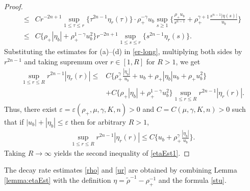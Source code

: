 \documentclass[a4paper,12pt,draft]{article}
\theoremstyle{remark}
\def\d{\partial}
\def\rt{\tilde{\rho}}
\def\ep{\varepsilon}
\begin{document}
\begin{proof}
\begin{align*}
        \le& C r^{-2n+1} \sup\limits_{1\le \tau\le r}\big\{\tau^{2n-1}\eta_r(\tau)\big\} \cdot \rho_{+}^{-\gamma} u_b \sup\limits_{s\ge 1}\bigg\{ \frac{\rho_{+} u_b}{s^{n-1}} + \rho_{+}^{\gamma+1}\frac{s^{n-1}|\eta(s)|}{u_b}  \bigg\}\\
        \le& C \big\{ \rho_{+}|\eta_b| + \rho_{+}^{1-\gamma} u_b^2 \big\} r^{-2n+1} \sup\limits_{1\le s \le r} \big\{ s^{2n-1} \eta_r(s) \big\}.
    \end{align*}
    Substituting the estimates for \textrm{(a)}--\textrm{(d)} in \eqref{er-long}, multiplying both sides by $r^{2n-1}$ and taking supremum over $r\in [1,R]$ for $R>1$, we get
    \begin{align*}
        \sup\limits_{1 \le r\le R} r^{2n-1} |\eta_r (r)| \le& C \Big\{ \rho_{+}^{\gamma} \frac{|\eta_b|}{u_b} + u_b  + \rho_{+}|\eta_b| u_b + \rho_{+} u_b^2 \Big\}\\ 
        &+ C \big\{\rho_{+}|\eta_b| + \rho_{+}^{1-\gamma} u_b^2 \big\} \sup\limits_{1\le r \le R} r^{2n-1} |\eta_r(r)|.
    \end{align*}
    Thus, there exist $\ep=\ep(\rho_+,\mu,\gamma,K,n)>0$ and $C=C(\mu,\gamma,K,n)>0$ such that if $|u_b|+|\eta_b|\le \ep$ then for arbitrary $R>1$,
    \begin{align*}
        \sup\limits_{1\le r \le R} r^{2n-1} |\eta_r (r)| %
        \le C \Big\{ u_b + \rho_{+}^{\gamma} \frac{|\eta_b|}{u_b} \Big\}.
    \end{align*}
    Taking $R\to \infty$ yields the second inequality of \eqref{etaEst1}. %
\end{proof}

The decay rate estimates \eqref{rho} and \eqref{ur}  are obtained by combining Lemma \ref{lemma:etaEst} with the definition $\eta=\rt^{-1}- \rho_{+}^{-1}$ and the formula \eqref{stu}.
\end{document}

